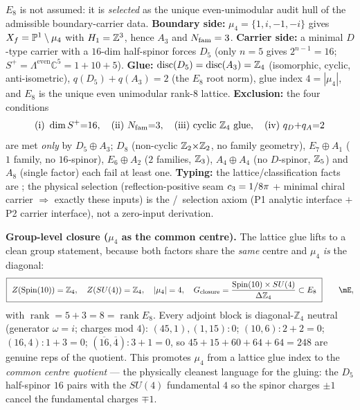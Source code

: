 \begin{keybox}
$E_8$ is not assumed: it is \emph{selected} as the unique even-unimodular audit hull of the admissible
boundary-carrier data. \textbf{Boundary side:} $\mu_4=\{1,i,-1,-i\}$ gives $X_f=\mathbb{P}^1\setminus\mu_4$ with
$H_1=\mathbb{Z}^3$, hence $A_3$ and $N_{\mathrm{fam}}=3$. \textbf{Carrier side:} a minimal $D$-type carrier with a $16$-dim
half-spinor forces $D_5$ (only $n=5$ gives $2^{n-1}=16$; $S^+=\Lambda^{\mathrm{even}}\mathbb C^5=1{+}10{+}5$).
\textbf{Glue:} $\operatorname{disc}(D_5)=\operatorname{disc}(A_3)=\mathbb{Z}_4$ (isomorphic, cyclic, anti-isometric),
$q(D_5)+q(A_3)=2$ (the $E_8$ root norm), glue index $4=|\mu_4|$, and $E_8$ is the unique even unimodular
rank-$8$ lattice. \textbf{Exclusion:} the four conditions
\[
  \text{(i) }\dim S^+{=}16,\quad\text{(ii) }N_{\mathrm{fam}}{=}3,\quad\text{(iii) cyclic }\mathbb{Z}_4\text{ glue},\quad
  \text{(iv) }q_D{+}q_A{=}2
\]
are met \emph{only} by $D_5\oplus A_3$; $D_8$ (non-cyclic $\mathbb{Z}_2{\times}\mathbb{Z}_2$, no family geometry),
$E_7{\oplus}A_1$ ($1$ family, no $16$-spinor), $E_6{\oplus}A_2$ ($2$ families, $\mathbb{Z}_3$), $A_4{\oplus}A_4$
(no $D$-spinor, $\mathbb{Z}_5$) and $A_8$ (single factor) each fail at least one. \textbf{Typing:} the
lattice/classification facts are \mE; the physical selection (reflection-positive seam $c_3=1/8\pi$ +
minimal chiral carrier $\Rightarrow$ exactly these inputs) is the \mC/\mO\ selection axiom (P1 analytic
interface $+$ P2 carrier interface), not a zero-input derivation. 
\end{keybox}

\noindent\textbf{Group-level closure ($\mu_4$ as the common centre).} The lattice glue lifts to a clean
group statement, because both factors share the \emph{same} centre and $\mu_4$ \emph{is} the diagonal:
\begin{equation}
  \boxed{\ Z(\mathrm{Spin}(10))=\mathbb Z_4,\quad Z(SU(4))=\mathbb Z_4,\quad |\mu_4|=4,\quad
  G_{\mathrm{closure}}=\frac{\mathrm{Spin}(10)\times SU(4)}{\Delta\mathbb Z_4}\subset E_8\ }\qquad\mE ,
\end{equation}
with $\operatorname{rank}=5+3=8=\operatorname{rank}E_8$. Every adjoint block is diagonal-$\mathbb Z_4$
neutral (generator $\omega=i$; charges mod $4$): $(45,1),(1,15)\!:\!0$; $(10,6)\!:\!2{+}2{=}0$;
$(16,4)\!:\!1{+}3{=}0$; $(\overline{16},\overline4)\!:\!3{+}1{=}0$, so $45{+}15{+}60{+}64{+}64=248$ are
genuine reps of the quotient. This promotes $\mu_4$ from a lattice glue index to the \emph{common centre
quotient} --- the physically cleanest language for the gluing: the $D_5$ half-spinor $16$ pairs with the
$SU(4)$ fundamental $4$ so the spinor charges $\pm1$ cancel the fundamental charges $\mp1$.

